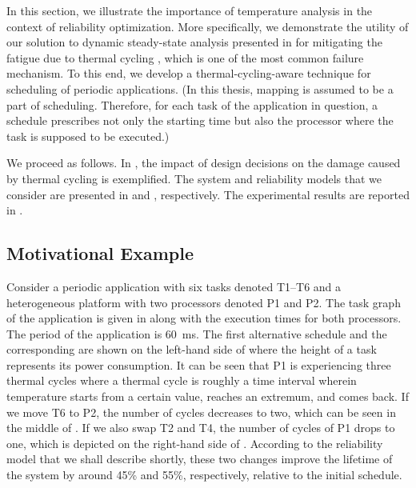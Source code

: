 In this section, we illustrate the importance of temperature analysis in the
context of reliability optimization. More specifically, we demonstrate the
utility of our solution to dynamic steady-state analysis presented in
 for mitigating the fatigue due to thermal
cycling \cite{jedec2010}, which is one of the most common failure mechanism. To
this end, we develop a thermal-cycling-aware technique for scheduling of
periodic applications. (In this thesis, mapping is assumed to be a part of
scheduling. Therefore, for each task of the application in question, a schedule
prescribes not only the starting time but also the processor where the task is
supposed to be executed.)

We proceed as follows. In , the impact of
design decisions on the damage caused by thermal cycling is exemplified. The
system and reliability models that we consider are presented in
 and , respectively. The experimental
results are reported in .

\subsection{Motivational Example}

Consider a periodic application with six tasks denoted T1--T6 and a
heterogeneous platform with two processors denoted P1 and P2. The task graph of
the application is given in  along with the
execution times for both processors. The period of the application is 60~ms. The
first alternative schedule and the corresponding  are shown on the
left-hand side of  where the height of a task
represents its power consumption. It can be seen that P1 is experiencing three
thermal cycles where a thermal cycle is roughly a time interval wherein
temperature starts from a certain value, reaches an extremum, and comes back. If
we move T6 to P2, the number of cycles decreases to two, which can be seen in
the middle of . If we also swap T2 and T4, the
number of cycles of P1 drops to one, which is depicted on the right-hand side of
. According to the reliability model that we
shall describe shortly, these two changes improve the lifetime of the system by
around 45\% and 55\%, respectively, relative to the initial schedule.

